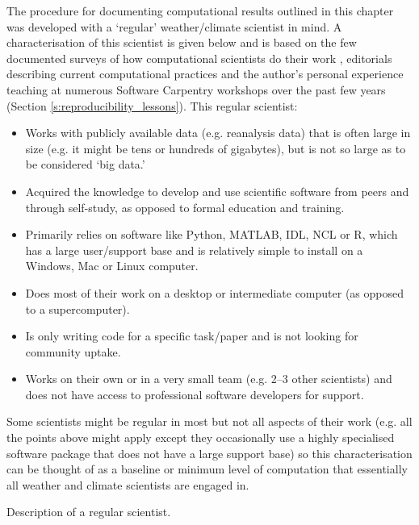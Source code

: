 \begin{featurebox}

\begin{tcolorbox}[width=\textwidth]

The procedure for documenting computational results outlined in this chapter was developed with a `regular' weather/climate scientist in mind. A characterisation of this scientist is given below and is based on the few documented surveys of how computational scientists do their work \citep{Hannay2009,Stodden2010,Momcheva2015}, editorials describing current computational practices \citep[e.g.][]{Easterbrook2014} and the author's personal experience teaching at numerous Software Carpentry workshops over the past few years (Section \ref{s:reproducibility_lessons}). This regular scientist:
\begin{itemize}
\item Works with publicly available data (e.g. reanalysis data) that is often large in size (e.g. it might be tens or hundreds of gigabytes), but is not so large as to be considered `big data.' 
\item Acquired the knowledge to develop and use scientific software from peers and through self-study, as opposed to formal education and training.
\item Primarily relies on software like Python, MATLAB, IDL, NCL or R, which has a large user/support base and is relatively simple to install on a Windows, Mac or Linux computer.
\item Does most of their work on a desktop or intermediate computer (as opposed to a supercomputer).
\item Is only writing code for a specific task/paper and is not looking for community uptake.  
\item Works on their own or in a very small team (e.g. 2--3 other scientists) and does not have access to professional software developers for support.
\end{itemize}

Some scientists might be regular in most but not all aspects of their work (e.g. all the points above might apply except they occasionally use a highly specialised software package that does not have a large support base) so this characterisation can be thought of as a baseline or minimum level of computation that essentially all weather and climate scientists are engaged in.  

\end{tcolorbox}

\caption{\label{box:regular_scientist}
Description of a regular scientist.}
\end{featurebox}


